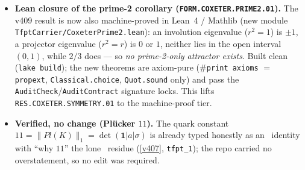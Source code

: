 \begin{itemize}
\item \textbf{Lean closure of the prime-2 corollary (\texttt{FORM.COXETER.PRIME2.01}).} The v409 result is now
also machine-proved in Lean~4 / Mathlib (new module \texttt{TfptCarrier/CoxeterPrime2.lean}): an involution
eigenvalue ($r^2{=}1$) is $\pm1$, a projector eigenvalue ($r^2{=}r$) is $0$ or $1$, neither lies in the open
interval $(0,1)$, while $2/3$ does --- so \emph{no prime-2-only attractor exists}. Built clean
(\texttt{lake build}); the new theorems are axiom-pure ($\#$\texttt{print axioms} $=$ \texttt{propext},
\texttt{Classical.choice}, \texttt{Quot.sound} only) and pass the \texttt{AuditCheck}/\texttt{AuditContract}
signature locks. This lifts \texttt{RES.COXETER.SYMMETRY.01} to the machine-proof tier.
\item \textbf{Verified, no change (Pl\"ucker $11$).} The quark constant $11{=}\|Pl(K)\|_1{=}\det(\mathbf1|a|\sigma)$
is already typed honestly as an \mE\ identity with ``why $11$'' the lone \mO\ residue (\vref{v407}, \texttt{tfpt\_1});
the repo carried no overstatement, so no edit was required.
\end{itemize}

